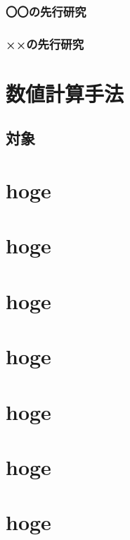 \documentclass[
    openany,oneside,
    paper=a4paper,      %
    book,               %
    fontsize=12pt,      %
    jafontsize=12pt,    %
    head_space=33mm,    %
    foot_space=30mm,    %
    gutter=25mm,        %
    fore-edge=10mm      %
    ]{jlreq}            %
\begin{document}
\lipsum[1-2]

\subsection{〇〇の先行研究}
\label{ssec:marumaru}

\lipsum[1-4]

\subsection{××の先行研究}
\label{ssec:batsubatsu}

\lipsum[1-4]

\chapter{数値計算手法}
\label{ch:method}

\lipsum[1]

\section{対象}
\label{sec:target}

\lipsum[1-8]


\chapter{hoge}

\chapter{hoge}

\chapter{hoge}

\chapter{hoge}

\chapter{hoge}

\chapter{hoge}

\chapter{hoge}
\end{document}
